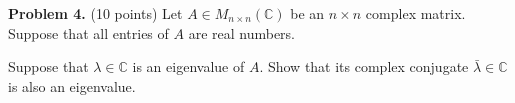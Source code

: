\documentclass[11pt]{exam}
\begin{document}
\begin{enumerate}

\newpage
\end{enumerate}

{\bf Problem 4.} (10 points) Let $A \in M_{n\times n}(\mathbb{C})$ be an $n \times n$ complex matrix. Suppose that all entries of $A$ are real numbers. 

\medskip

Suppose that $\lambda \in \mathbb{C}$ is an eigenvalue of $A$. Show that its complex conjugate $\bar{\lambda}\in \mathbb{C}$ is also an eigenvalue.
\end{document}
